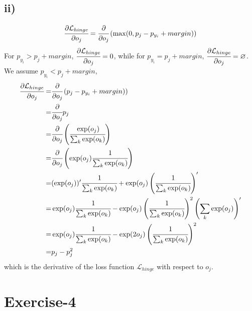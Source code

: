 \documentclass[10pt]{article}
\begin{document}
\subsection*{ii)}
\begin{align*}
\cfrac{\partial \mathcal{L}_{hinge}}{\partial o_j} = \cfrac{\partial}{\partial o_j} \left(   \max(0, p_j - p_{y_i} + margin) \right)
\end{align*}
For $p_{y_i} > p_j + margin$, $\cfrac{\partial \mathcal{L}_{hinge}}{\partial o_j} = 0$, while for $p_{y_i} = p_j + margin$, $\cfrac{\partial \mathcal{L}_{hinge}}{\partial o_j} = \varnothing$.
We assume $p_{y_i} < p_j + margin$,
\begin{align*}
\cfrac{\partial \mathcal{L}_{hinge}}{\partial o_j} =& \cfrac{\partial}{\partial o_j} \left(   p_j - p_{y_i} + margin) \right)\\
=& \cfrac{\partial}{\partial o_j} p_j\\
=& \cfrac{\partial}{\partial o_j} \left( \cfrac{\exp(o_j)}{\sum_k \exp(o_k)} \right)\\
=& \cfrac{\partial}{\partial o_j} \left( \exp(o_j) \cfrac{1}{\sum_k \exp(o_k)} \right)\\
=& (\exp(o_j))' \cfrac{1}{\sum_k \exp(o_k)} + \exp(o_j) \left( \cfrac{1}{\sum_k \exp(o_k)} \right)'  \\
=& \exp(o_j) \cfrac{1}{\sum_k \exp(o_k)} - \exp(o_j) \left( \cfrac{1}{\sum_k \exp(o_k)} \right)^2 \left( \sum_k \exp(o_j) \right)'  \\
=& \exp(o_j) \cfrac{1}{\sum_k \exp(o_k)} - \exp(2o_j) \left( \cfrac{1}{\sum_k \exp(o_k)} \right)^2\\
=& p_j - p_j^2
\end{align*}
which is the derivative of the loss function $\mathcal{L}_{hinge}$ with respect to $o_j$.



\section*{Exercise-4}
\end{document}
